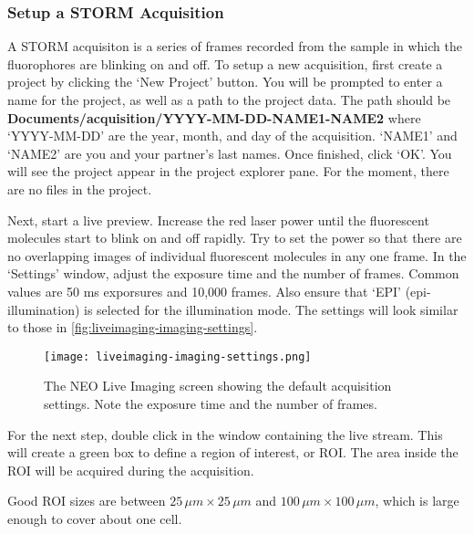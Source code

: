 \documentclass[10pt,a4paper,oneside]{book}
\begin{document}
\subsubsection{Setup a STORM Acquisition}

A STORM acquisiton is a series of frames recorded from the sample in which the fluorophores are blinking on and off. To setup a new acquisition, first create a project by clicking the `New Project' button. You will be prompted to enter a name for the project, as well as a path to the project data. The path should be \textbf{Documents/acquisition/YYYY-MM-DD-NAME1-NAME2} where `YYYY-MM-DD' are the year, month, and day of the acquisition. `NAME1' and `NAME2' are you and your partner's last names. Once finished, click `OK'. You will see the project appear in the project explorer pane. For the moment, there are no files in the project.

Next, start a live preview. Increase the red laser power until the fluorescent molecules start to blink on and off rapidly. Try to set the power so that there are no overlapping images of individual fluorescent molecules in any one frame. In the `Settings' window, adjust the exposure time and the number of frames. Common values are 50 ms exporsures and 10,000 frames. Also ensure that `EPI' (epi-illumination) is selected for the illumination mode. The settings will look similar to those in \autoref{fig:liveimaging-imaging-settings}.

\begin{figure}[ht]
    \centering
    \texttt{[image: liveimaging-imaging-settings.png]}
    \caption{The NEO Live Imaging screen showing the default acquisition settings. Note the exposure time and the number of frames.}
    \label{fig:liveimaging-imaging-settings}
\end{figure}

For the next step, double click in the window containing the live stream. This will create a green box to define a region of interest, or ROI. The area inside the ROI will be acquired during the acquisition.

\newline

Good ROI sizes are between $25 \, \mu m\times 25 \, \mu m$ and $100 \, \mu m\times 100 \, \mu m$, which is large enough to cover about one cell.
\end{document}
